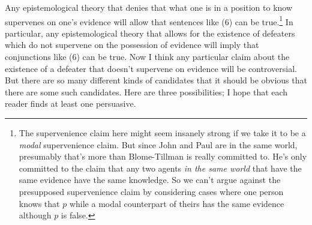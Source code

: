 Any epistemological theory that denies that what one is in a position to know supervenes on one's evidence will allow that sentences like (6) can be true.\footnote{The supervenience claim here might seem insanely strong if we take it to be a \textit{modal} supervenience claim. But since John and Paul are in the same world, presumably that's more than Blome-Tillman is really committed to. He's only committed to the claim that any two agents \textit{in the same world} that have the same evidence have the same knowledge. So we can't argue against the presupposed supervenience claim by considering cases where one person knows that \(p\) while a modal counterpart of theirs has the same evidence although \(p\) is false.} In particular, any epistemological theory that allows for the existence of defeaters which do not supervene on the possession of evidence will imply that conjunctions like (6) can be true. Now I think any particular claim about the existence of a defeater that doesn't supervene on evidence will be controversial. But there are so many different kinds of candidates that it should be obvious that there are some such candidates. Here are three possibilities; I hope that each reader finds at least one persuasive. 

